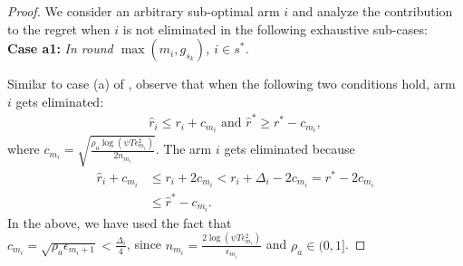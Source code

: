 \begin{proof}
We consider an arbitrary sub-optimal arm ${i}$ and analyze the contribution to the regret when $i$ is not eliminated in the following exhaustive sub-cases:\\
\textbf{Case a1:} \textit{In round $\max(m_{i},g_{s_{k}})$, ${i} \in s^{*}$.}

Similar to case (a) of \cite{auer2010ucb}, observe that when the following two conditions hold, arm $i$ gets eliminated:
\begin{align}
\hat{r}_{i}  \le r_{i} + c_{m_{i}} \text{ and } 
 \hat{r}^{*}\geq  r^{*} - c_{m_{i}}, \label{eq:armelim-casea1}
\end{align}
where  $c_{m_{i}}=\sqrt{\frac{\rho_{a}\log (\psi T\epsilon_{m_{i}}^{2})}{2 n_{m_{i}}}}$.
The arm $i$ gets eliminated because 
  \begin{align*}
\hat{r}_{i} + c_{m_{i}}&\leq r_{i} + 2c_{m_{i}} < r_{i} + \Delta_{i} - 2c_{m_{i}} = r^{*} -2c_{m_{i}} \\
 &\leq \hat{r}^{*} - c_{m_{i}}.
  \end{align*}
In the above, we have used the fact that \\ $c_{m_{i}} = \sqrt{\rho_{a}\epsilon_{m_{i}+1}} < \frac{\Delta_{i}}{4}$, since $n_{m_{i}}=\frac{2\log{(\psi T\epsilon_{m_{i}}^{2})}}{\epsilon_{m_{i}}}$ and $\rho_{a}\in (0,1]$.


\end{proof}
